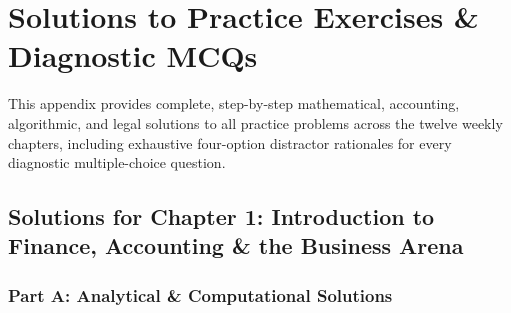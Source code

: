 \chapter{Solutions to Practice Exercises \& Diagnostic MCQs}

This appendix provides complete, step-by-step mathematical, accounting, algorithmic, and legal solutions to all practice problems across the twelve weekly chapters, including exhaustive four-option distractor rationales for every diagnostic multiple-choice question.

\section*{Solutions for Chapter 1: Introduction to Finance, Accounting \& the Business Arena}

\subsection*{Part A: Analytical \& Computational Solutions}

